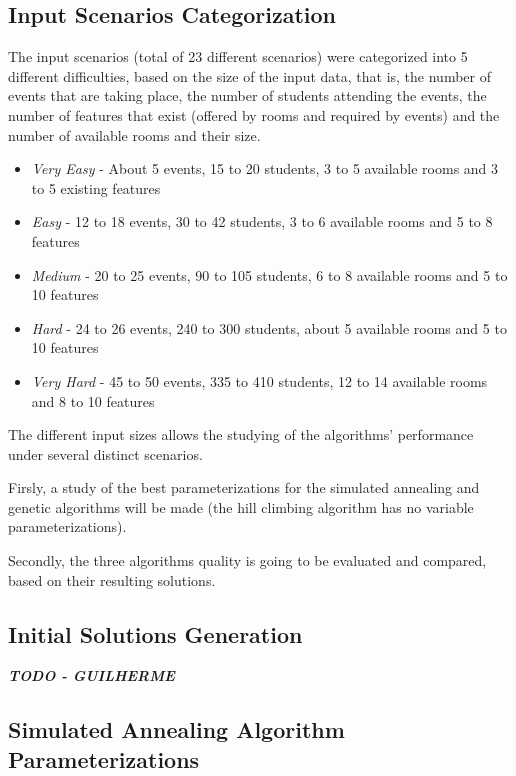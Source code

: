 \documentclass[conference]{IEEEtran}
\begin{document}
\subsection{Input Scenarios Categorization}

The input scenarios (total of 23 different scenarios) were categorized into 5 different difficulties, based on the size of the input data, that is, the number of events that are taking place, the number of students attending the events, the number of features that exist (offered by rooms and required by events) and the number of available rooms and their size.

\begin{itemize}
    \item \textit{Very Easy} - About 5 events, 15 to 20 students, 3 to 5 available rooms and 3 to 5 existing features 
    \item \textit{Easy} - 12 to 18 events, 30 to 42 students, 3 to 6 available rooms and 5 to 8 features 
    \item \textit{Medium} - 20 to 25 events, 90 to 105 students, 6 to 8 available rooms and 5 to 10 features
    \item \textit{Hard} - 24 to 26 events, 240 to 300 students, about 5 available rooms and 5 to 10 features
    \item \textit{Very Hard} - 45 to 50 events, 335 to 410 students, 12 to 14 available rooms and 8 to 10 features
\end{itemize}

The different input sizes allows the studying of the algorithms' performance under several distinct scenarios.

Firsly, a study of the best parameterizations for the simulated annealing and genetic algorithms will be made (the hill climbing algorithm has no variable parameterizations).

Secondly, the three algorithms quality is going to be evaluated and compared, based on their resulting solutions.

\subsection{Initial Solutions Generation} \label{subsec:isg}

\textbf{\textit{TODO - GUILHERME}}

\subsection{Simulated Annealing Algorithm Parameterizations}
\end{document}
